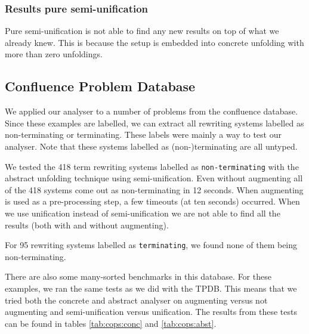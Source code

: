 \subsubsection{Results pure semi-unification}
Pure semi-unification is not able to find any new results on top of what we already knew. This is because the setup is embedded into concrete unfolding with more than zero unfoldings. 

\subsection{Confluence Problem Database}
We applied our analyser to a number of problems from the confluence database. Since these examples are labelled,  we can extract all rewriting systems labelled as non-terminating or terminating. These labels were mainly a way to test our analyser. Note that these systems labelled as (non-)terminating are all untyped. 

We tested the 418 term rewriting systems labelled as \texttt{non-terminating} with the abstract unfolding technique using semi-unification. Even without augmenting all of the 418 systems come out as non-terminating in 12 seconds. When augmenting is used as a pre-processing step, a few timeouts (at ten seconds) occurred. When we use unification instead of semi-unification we are not able to find all the results (both with and without augmenting). 

For 95 rewriting systems labelled as \texttt{terminating}, we found none of them being non-terminating. 

There are also some many-sorted benchmarks in this database. For these examples, we ran the same tests as we did with the TPDB. This means that we tried both the concrete and abstract analyser on augmenting versus not augmenting and semi-unification versus unification. The results from these tests can be found in tables \ref{tab:cops:conc} and \ref{tab:cops:abst}. 

